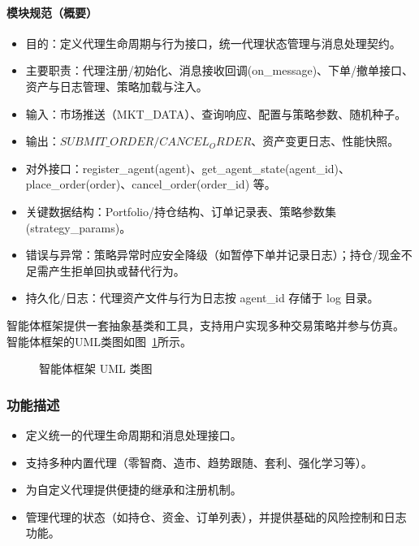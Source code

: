 \paragraph{模块规范（概要）}
\begin{itemize}
  \item 目的：定义代理生命周期与行为接口，统一代理状态管理与消息处理契约。
  \item 主要职责：代理注册/初始化、消息接收回调(on\_message)、下单/撤单接口、资产与日志管理、策略加载与注入。
  \item 输入：市场推送（MKT\_DATA）、查询响应、配置与策略参数、随机种子。
  \item 输出：$SUBMIT\_ORDER/CANCEL_ORDER$、资产变更日志、性能快照。
  \item 对外接口：register\_agent(agent)、get\_agent\_state(agent\_id)、place\_order(order)、cancel\_order(order\_id) 等。
  \item 关键数据结构：Portfolio/持仓结构、订单记录表、策略参数集 (strategy\_params)。
  \item 错误与异常：策略异常时应安全降级（如暂停下单并记录日志）；持仓/现金不足需产生拒单回执或替代行为。
  \item 持久化/日志：代理资产文件与行为日志按 agent\_id 存储于 log 目录。
\end{itemize}

智能体框架提供一套抽象基类和工具，支持用户实现多种交易策略并参与仿真。
智能体框架的UML类图如图~\ref{fig:uml_agent}所示。

\begin{figure}[H]
  \centering
  \resizebox{\linewidth}{!}{}
  \caption{智能体框架 UML 类图}
  \label{fig:uml_agent}
\end{figure}

\subsubsection{功能描述}
\begin{itemize}
  \item 定义统一的代理生命周期和消息处理接口。
  \item 支持多种内置代理（零智商、造市、趋势跟随、套利、强化学习等）。
  \item 为自定义代理提供便捷的继承和注册机制。
  \item 管理代理的状态（如持仓、资金、订单列表），并提供基础的风险控制和日志功能。
\end{itemize}

